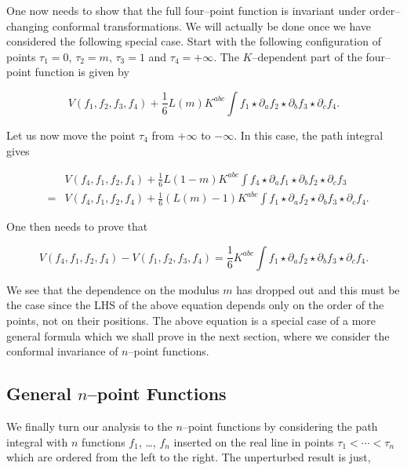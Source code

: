 \documentclass[a4paper,11pt]{article}
\begin{document}
One now needs to show that the full four--point function is invariant under
order--changing conformal transformations. We will actually be done once we
have considered the following special case. Start with the following
configuration of points $\tau_{1}=0$, $\tau_{2}=m$, $\tau_{3}=1$ and
$\tau_{4} = +\infty $. The $K$--dependent part of the four--point function
is given by

$$
V\left( f_{1},f_{2},f_{3},f_{4}\right) +\frac{1}{6}L\left( m\right)
K^{abc}\int f_{1}\star \partial _{a}f_{2}\star \partial _{b}f_{3}\star
\partial _{c}f_{4}.
$$

\noindent
Let us now move the point $\tau _{4}$ from $+\infty $ to $-\infty $. In this
case, the path integral gives 

\begin{eqnarray*}
&&V\left( f_{4},f_{1},f_{2},f_{4}\right) +\frac{1}{6}L\left( 1-m\right)
K^{abc}\int f_{4}\star \partial _{a}f_{1}\star \partial _{b}f_{2}\star
\partial _{c}f_{3} \\
&=&V\left( f_{4},f_{1},f_{2},f_{4}\right) +\frac{1}{6}\left( L\left(
m\right) -1\right) K^{abc}\int f_{1}\star \partial _{a}f_{2}\star \partial
_{b}f_{3}\star \partial _{c}f_{4}.
\end{eqnarray*}

\noindent
One then needs to prove that 

$$
V\left( f_{4},f_{1},f_{2},f_{4}\right) -V\left(
f_{1},f_{2},f_{3},f_{4}\right) =\frac{1}{6}K^{abc}\int f_{1}\star \partial
_{a}f_{2}\star \partial _{b}f_{3}\star \partial _{c}f_{4}.
$$

\noindent
We see that the dependence on the modulus $m$ has dropped out and this must
be the case since the LHS of the above equation depends only on the order of
the points, not on their positions. The above equation is a special case of
a more general formula which we shall prove in the next section, where we
consider the conformal invariance of $n$--point functions.


\subsection{General $n$--point Functions}


We finally turn our analysis to the $n$--point functions by considering the 
path integral with $n$ functions $f_{1}$, \dots, $f_{n}$ inserted on the real 
line in points $\tau _{1}<\cdots <\tau _{n}$ which are ordered from 
the left to the right. The unperturbed result is just,
\end{document}
